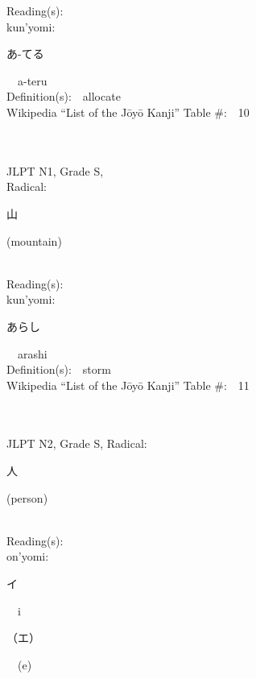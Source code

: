\begin{multicols}{2}
Reading(s):\ \ \\
{\hspace*{1em}}kun'yomi:\ \ \\
{\hspace*{2em}}{\begin{CJK}{UTF8}{min} あ-てる \end{CJK}}\ \ a-teru\ \ \\
Definition(s):\ \ allocate \\
Wikipedia ``List of the J\=oy\=o Kanji'' Table \#:\ \     10 \\
\ \ \\
{\fontsize{34pt}{40pt}  }\ \ \\
{JLPT N1, Grade S, \\Radical:\ \ {\begin{CJK}{UTF8}{min} 山 \end{CJK}} (mountain) } \\
Reading(s):\ \ \\
{\hspace*{1em}}kun'yomi:\ \ \\
{\hspace*{2em}}{\begin{CJK}{UTF8}{min} あらし \end{CJK}}\ \ arashi\ \ \\
Definition(s):\ \ storm \\
Wikipedia ``List of the J\=oy\=o Kanji'' Table \#:\ \     11 \\
\ \ \\
{\fontsize{34pt}{40pt}  }\ \ \\  %
{JLPT N2, Grade S, Radical:\ \ {\begin{CJK}{UTF8}{min} 人 \end{CJK}} (person) } \\
Reading(s):\ \ \\
{\hspace*{1em}}on'yomi:\ \ \\
{\hspace*{2em}}{\begin{CJK}{UTF8}{min} イ \end{CJK}}\ \ i\ \ \\
{\hspace*{2em}}{\begin{CJK}{UTF8}{min} （エ） \end{CJK}}\ \ (e)\ \ \\

\end{multicols}
